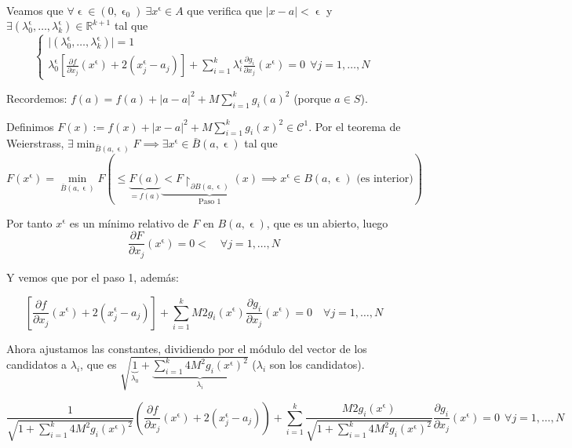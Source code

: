 \documentclass[11pt, a4paper]{article}
\makeatletter
\let\epsilon\upvarepsilon
\renewenvironment{proof}[1][\proofname] {\vspace{-15pt}\par\pushQED{\qed}\normalfont\topsep6\p@\@plus6\p@\relax\trivlist\item[\hskip\labelsep\it#1\@addpunct{.}]\ignorespaces}{\popQED\endtrivlist\@endpefalse}
\providecommand{\abs}[1]{\lvert#1\rvert}
\theoremstyle{theorem-style}
\theoremstyle{definition-style}
\theoremstyle{remark-style}
\theoremstyle{example-style}
\makeatother
\begin{document}
\begin{proof}[Demostración (método de penalización)]
	\hfill\\
	Veamos que $\forall \epsilon\in (0,\epsilon_0)\ \exists x^{\epsilon}\in A$ que verifica que $\abs{x-a} < \epsilon$ y $\exists(\lambda^{\epsilon}_0, \dots, \lambda_k^{\epsilon})\in \mathbb{R}^{k+1}$ tal que
	\[
		\begin{cases}
	\abs{(\lambda_0^{\epsilon}, \dots, \lambda_k^{\epsilon})} = 1\\
	\lambda_0^{\epsilon}\left[\displaystyle\frac{\partial f}{\partial x_j}(x^{\epsilon})+2(x_j^{\epsilon}-a_j)\right] + \displaystyle\sum_{i=1}^k \lambda_i^\epsilon \frac{\partial g_i}{\partial x_j}(x^{\epsilon}) = 0 \ \ \forall j=1,\dots,N
\end{cases}
	\]
	
	Recordemos: $f(a) = f(a)+\abs{a-a}^2+M\displaystyle\sum_{i=1}^k g_i(a)^2$ (porque $a\in S$).
	
	Definimos $F(x) := f(x) + \abs{x-a}^2 + M\displaystyle\sum_{i=1}^k g_i(x)^2 \in \mathcal{C}^1$. Por el teorema de Weierstrass, $\exists \min_{\bar{B}(a,\epsilon)} F \implies \exists x^{\epsilon}\in \bar{B}(a,\epsilon)$ tal que
	\[
	F(x^{\epsilon}) = \min_{\bar{B}(a, \epsilon)} F \left( \le \underbrace{F(a)}_{=f(a)} \underbrace{<F\restriction_{\partial B(a,\epsilon)} (x)}_{\text{Paso 1}}\implies x^{\epsilon}\in B(a,\epsilon) \text{ (es interior)}  \right)
	\]
	
	Por tanto $x^\epsilon$ es un mínimo relativo de $F$ en $B(a,\epsilon)$, que es un abierto, luego \[\displaystyle \frac{\partial F}{\partial x_j}(x^{\epsilon}) = 0<\quad \forall j=1,\dots, N\] 
	
	Y vemos que por el paso 1, además:
	
	\[
	\left[\frac{\partial f}{\partial x_j}(x^{\epsilon}) + 2(x_j^{\epsilon}-a_j)\right]+\sum_{i=1}^k M2g_i(x^{\epsilon})\frac{\partial g_i}{\partial x_j}(x^{\epsilon}) = 0\quad \forall j=1,\dots,N
	\]
	
	Ahora ajustamos las constantes, dividiendo por el módulo del vector de los candidatos a $\lambda_i$, que es $\sqrt{\underbrace{1}_{\lambda_0}+\underbrace{\sum_{i=1}^k 4M^2g_i(x^{\epsilon})^2}_{\lambda_i}}$  ($\lambda_i$ son los candidatos).
	
\[
	\frac{1}{\sqrt{1+\sum_{i=1}^k 4M^2g_i(x^{\epsilon})^2}}\left( \frac{\partial f}{\partial x_j}(x^{\epsilon})+2(x_j^{\epsilon}-a_j) \right)+\sum_{i=1}^k \frac{M2g_i(x^{\epsilon})}{\sqrt{1+\sum_{i=1}^k 4M^2g_i(x^{\epsilon})^2}}\frac{\partial g_i}{\partial x_j}(x^{\epsilon}) = 0\ \ \forall j=1,\dots, N
\]
	

\end{proof}
\end{document}
